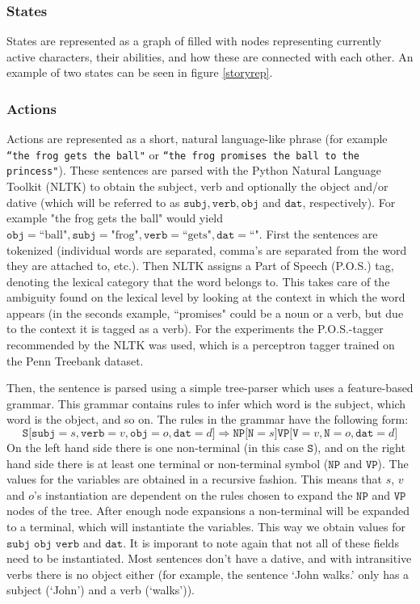 \subsubsection{States}

States are represented as a graph of filled with nodes representing currently
active characters, their abilities, and how these are connected with each other.
An example of two states can be seen in figure \ref{storyrep}.

\subsubsection{Actions}

Actions are represented as a short, natural language-like phrase (for example 
\texttt{``the frog gets the ball"}
or \texttt{``the frog promises the ball to the princess"}).
These sentences are parsed with the Python Natural Language Toolkit (NLTK)
\cite{BirdKleinLoper09}
to obtain the subject, verb and optionally the object and/or dative (which will be
referred to as $\texttt{subj}, \texttt{verb}, \texttt{obj}$ and $\texttt{dat}$,
respectively). For example "the frog gets the ball" would yield 
$\texttt{obj}=\textrm{``ball"}, \texttt{subj}=\textrm{"frog"},
\texttt{verb}=\textrm{``gets"}, \texttt{dat}=\textrm{``"} $. First the
sentences are tokenized (individual words are separated, comma's are separated
from the word they are attached to, etc.). Then NLTK assigns a
Part of Speech (P.O.S.) tag, denoting the lexical category that the word belongs
to. This takes care of the ambiguity found on the lexical level by looking at
the context in which the word appears (in the seconds example, ``promises" could
be a noun or a verb, but due to the context it is tagged as a verb). For the
experiments the P.O.S.-tagger recommended by the NLTK was used, which is a perceptron tagger
trained on the Penn Treebank dataset.

Then, the sentence is parsed using a simple tree-parser which uses a feature-based
grammar. This grammar contains rules to infer which word is the subject, which
word is the object, and so on. The rules in the grammar have the following form:
$$
\texttt{S}{[}\texttt{subj}=s, \texttt{verb}=v, \texttt{obj}=o, \texttt{dat}=d{]}
\Rightarrow
\texttt{NP}{[}\texttt{N}=s{]} \texttt{VP}{[}\texttt{V}=v, \texttt{N}=o,
\texttt{dat}=d{]}
$$
On the left hand side there is one non-terminal (in this case $\texttt{S}$), and
on the right hand side there is at least one terminal or non-terminal symbol
($\texttt{NP}$ and $\texttt{VP}$). The values for the variables are obtained in
a recursive fashion. This means that $s$, $v$ and $o$'s instantiation are dependent on the rules
chosen to expand the $\texttt{NP}$ and $\texttt{VP}$ nodes of the tree. After
enough node expansions a non-terminal will be expanded to a terminal, which will
instantiate the variables. This way we obtain values for $\texttt{subj}$ 
$\texttt{obj}$ $\texttt{verb}$ and $\texttt{dat}$. It is imporant to note again that
not all of these fields need to be instantiated. Most sentences don't have a
dative, and with intransitive verbs there is no object either (for example, the
sentence `John walks.' only has a subject (`John') and a verb (`walks')).

